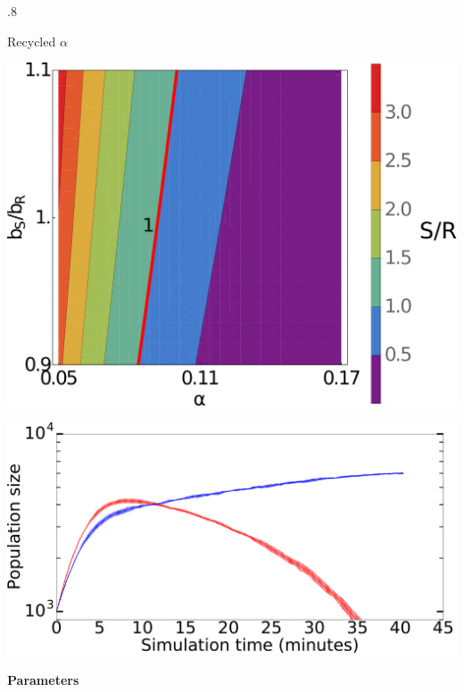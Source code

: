 \documentclass[final]{beamer}
\newlength{\onecolwid}
\newlength{\figwid}
\begin{document}
\begin{frame}[t]
\begin{block}
\begin{columns}[t]
\begin{column}{.8\onecolwid}
  \begin{block}{Recycled $\alpha$}
    \begin{center}
      \includegraphics[width=\figwid]{../dev/graphics/poster/recycled_contour.pdf}
      \vspace{1.5ex}
        \begin{minipage}[h]{0.5\onecolwid}
        \includegraphics[width=.9\figwid]{../dev/graphics/poster/recycled_pop.pdf}
      \end{minipage}%
      \begin{minipage}[h]{.1\onecolwid}
        \vfill \textbf{Parameters} \vspace{3mm}\\
        \begin{tabular}{l  r  c|c  l  r}

\end{tabular}
\end{minipage}
\end{center}
\end{block}
\end{column}
\end{columns}
\end{block}
\end{frame}
\end{document}
